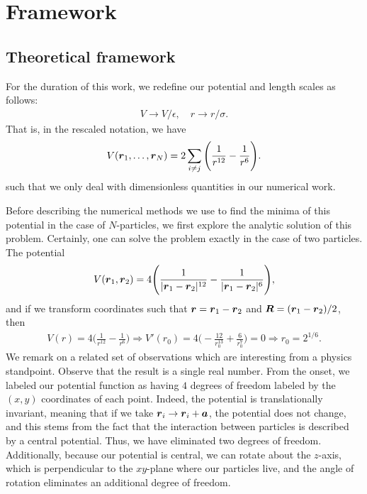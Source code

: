 \section{Framework}

\subsection{Theoretical framework}

For the duration of this work, we redefine our potential and length scales as follows:
\begin{align}
    V \rightarrow V/\epsilon, \quad r \rightarrow r/\sigma
.\end{align}
That is, in the rescaled notation, we have
\begin{align}
    V(\vb*{r}_{1},\ldots,\vb*{r}_{N}) = 2 \sum_{i \ne j} \Bigg( \frac{1}{r^{12}} - \frac{1}{r^{6}} \Bigg)
.\end{align}
such that we only deal with dimensionless quantities in our numerical work.

Before describing the numerical methods we use to find the minima of this potential in the case of $N$-particles, we first explore the analytic solution of this problem.
Certainly, one can solve the problem exactly in the case of two particles.
The potential
\begin{align}
    V(\vb*{r}_1,\vb*{r}_2) = 4 \Bigg( \frac{1}{|\vb*{r}_{1} - \vb*{r}_{2}|^{12}} - \frac{1}{|\vb*{r}_{1} - \vb*{r}_{2}|^{6}} \Bigg)
,\end{align}
and if we transform coordinates such that $\vb*{r} = \vb*{r}_{1} - \vb*{r}_{2}$ and $\vb*{R} = (\vb*{r}_{1} - \vb*{r}_{2})/2$, then
\begin{align}
    V(r) = 4 \Bigg( \frac{1}{r^{12}} - \frac{1}{r^{6}} \Bigg) \Rightarrow V'(r_0) = 4 \Bigg( -\frac{12}{r_0^{13}} + \frac{6}{r_0^{7}} \Bigg) = 0 \Rightarrow r_0 = 2^{1/6}
.\end{align}
We remark on a related set of observations which are interesting from a physics standpoint.
Observe that the result is a single real number.
From the onset, we labeled our potential function as having $4$ degrees of freedom labeled by the $(x,y)$ coordinates of each point.
Indeed, the potential is translationally invariant, meaning that if we take $\vb*{r}_{i} \rightarrow \vb*{r}_{i} + \vb*{a}$, the potential does not change, and this stems from the fact that the interaction between particles is described by a central potential.
Thus, we have eliminated two degrees of freedom.
Additionally, because our potential is central, we can rotate about the $z$-axis, which is perpendicular to the $xy$-plane where our particles live, and the angle of rotation eliminates an additional degree of freedom.

